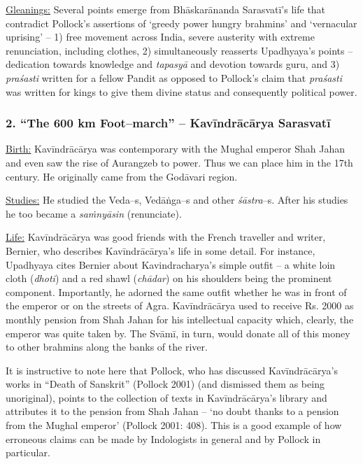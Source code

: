 \underline{Gleanings:} Several points emerge from Bhāskarānanda Sarasvatī’s life that contradict Pollock’s assertions of ‘greedy power hungry brahmins’ and ‘vernacular uprising’ – 1) free movement across India, severe austerity with extreme renunciation, including clothes, 2) simultaneously reasserts Upadhyaya’s points – dedication towards knowledge and \textit{tapasyā} and devotion towards guru, and 3) \textit{praśasti} written for a fellow Pandit as opposed to Pollock’s claim that \textit{praśasti} was written for kings to give them divine status and consequently political power.


\subsubsection*{2. “The 600 km Foot–march” – Kavīndrācārya Sarasvatī\protect{}}

\underline{Birth:} Kavīndrācārya was contemporary with the Mughal emperor Shah Jahan and even saw the rise of Aurangzeb to power. Thus we can place him in the 17th century. He originally came from the Godāvari region.

\underline{Studies:} He studied the Veda–s, Vedāṅga–s and other \textit{śāstra}–s. After his studies he too became a \textit{saṁnyāsin} (renunciate).

\underline{Life:} Kavīndrācārya was good friends with the French traveller and writer, Bernier, who describes Kavīndrācārya’s life in some detail. For instance, Upadhyaya cites Bernier about Kavindracharya’s simple outfit – a white loin cloth (\textit{dhoti}) and a red shawl (\textit{chādar}) on his shoulders being the prominent component. Importantly, he adorned the same outfit whether he was in front of the emperor or on the streets of Agra. Kavīndrācārya used to receive Rs. 2000 as monthly pension from Shah Jahan for his intellectual capacity which, clearly, the emperor was quite taken by. The Svāmī, in turn, would donate all of this money to other brahmins along the banks of the river.

It is instructive to note here that Pollock, who has discussed Kavīndrācārya’s works in “Death of Sanskrit” (Pollock 2001) (and dismissed them as being unoriginal), points to the collection of texts in Kavīndrācārya’s library and attributes it to the pension from Shah Jahan – ‘no doubt thanks to a pension from the Mughal emperor’ (Pollock 2001: 408). This is a good example of how erroneous claims can be made by Indologists in general and by Pollock in particular.

